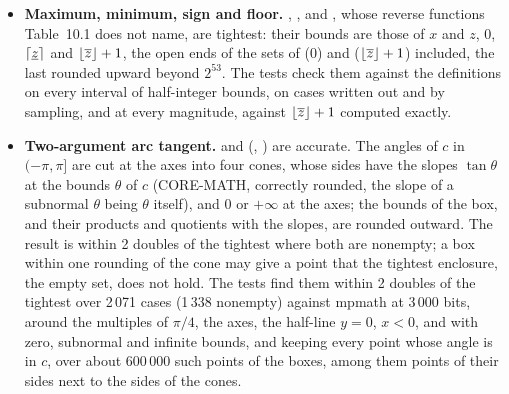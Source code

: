 \begin{itemize}
  with $d^y$ (or $x^d$) proved by CORE-MATH's , correctly
  rounded, to be on one side of $c$, and the smallest one on the other
  side. A bound of $x$ where the solutions start between it and the next
  double, and whose power is within one double of $c$, is kept, which only
  knowing whether that power is a double would settle: the result is then
  within the tightest one for $x$ one double wider. The tests find them tightest
  on the 804 cases of ITF1788 and on 1\,244 others, random or whose
  solutions are doubles, within the tightest result for $x$ one double
  wider on 966 cases where a bound of $x$ is next to an end of the
  solutions, and keeping the 54\,305 points of 6\,000 random boxes whose
  power is within $c$.
\item[$\bullet$] \textbf{Maximum, minimum, sign and floor.}\newinvfive{}
  , ,
   and , whose reverse
  functions Table~10.1 does not name, are tightest: their bounds are those
  of $x$ and $z$, $0$, $\lceil\underline{z}\rceil$ and
  $\lfloor\overline{z}\rfloor+1$, the open ends of the sets of
   ($0$) and 
  ($\lfloor\overline{z}\rfloor+1$) included, the last rounded upward
  beyond $2^{53}$. The tests check them against the definitions on every
  interval of half-integer bounds, on cases written out and by sampling,
  and  at every magnitude, against
  $\lfloor\overline{z}\rfloor+1$ computed exactly.
\item[$\bullet$] \textbf{Two-argument arc tangent.}\newinvfive{}
   and 
  (, ) are accurate. The angles of $c$ in
  $(-\pi, \pi]$ are cut at the axes into four cones, whose sides have the
  slopes $\tan\theta$ at the bounds $\theta$ of $c$ (CORE-MATH, correctly
  rounded, the slope of a subnormal $\theta$ being $\theta$ itself), and
  $0$ or $+\infty$ at the axes; the bounds of the box, and their products
  and quotients with the slopes, are rounded outward. The result is within
  2 doubles of the tightest where both are nonempty; a box within one
  rounding of the cone may give a point that the tightest enclosure, the
  empty set, does not hold. The tests find them within 2 doubles of the
  tightest over 2\,071 cases (1\,338 nonempty) against mpmath at 3\,000
  bits, around the multiples of $\pi/4$, the axes, the half-line $y=0$,
  $x<0$, and with zero, subnormal and infinite bounds, and keeping every
  point whose angle is in $c$, over about 600\,000 such points of the
  boxes, among them points of their sides next to the sides of the cones.
\end{itemize}

